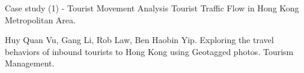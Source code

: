 \documentclass[
 size=14pt,
 paper=smartboard,  %
 mode=present, 		%
 display=slides, 	%
 style=tuliplab,  	%
 pauseslide,
 fleqn,leqno]{powerdot}
\begin{document}
\begin{slide}[toc=,bm=]{Case study (1) - Tourist Movement Analysis}
Tourist Traffic Flow in Hong Kong Metropolitan Area.

\begin{figure}[htbp]
\end{figure}
\begin{thebibliography}{1*}
\small{Huy Quan Vu, Gang Li, Rob Law, Ben Haobin Yip.
Exploring the travel behaviors of inbound tourists to Hong Kong using Geotagged photos.
Tourism Management.}
\end{thebibliography}
\end{slide}


%
%
\end{document}
